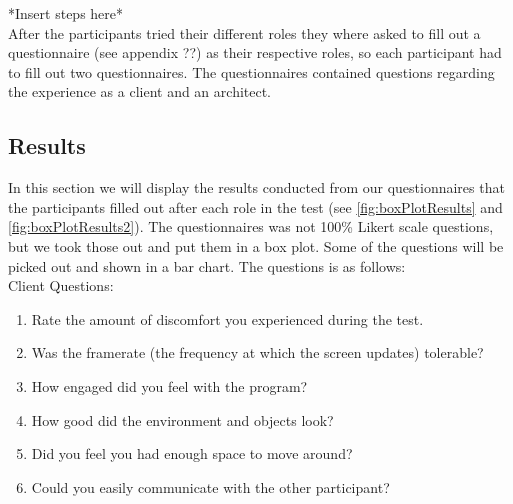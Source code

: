 *Insert steps here*\\

After the participants tried their different roles they where asked to fill out a questionnaire (see appendix ??) as their respective roles, so each participant had to fill out two questionnaires. The questionnaires contained questions regarding the experience as a client and an architect.

\subsection{Results}
In this section we will display the results conducted from our questionnaires that the participants filled out after each role in the test (see \autoref{fig:boxPlotResults} and \autoref{fig:boxPlotResults2}). The questionnaires was not 100\% Likert scale questions, but we took those out and put them in a box plot. Some of the questions will be picked out and shown in a bar chart.
The questions is as follows:\\

Client Questions:\\
\begin{enumerate}
\item Rate the amount of discomfort you experienced during the test.
\item Was the framerate (the frequency at which the screen updates) tolerable?
\item How engaged did you feel with the program?
\item How good did the environment and objects look?
\item Did you feel you had enough space to move around?
\item Could you easily communicate with the other participant?
\end{enumerate}


